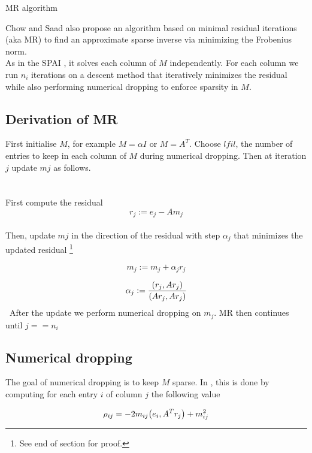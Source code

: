 \documentclass[paper=A4, fontsize=11pt]{scrartcl}
\let\originalleft\left
\let\originalright\right
\renewcommand{\left}{\mathopen{}\mathclose\bgroup\originalleft}
\renewcommand{\right}{\aftergroup\egroup\originalright}
\theoremstyle{remark}
\begin{document}
\begin{section}{MR algorithm}
	
	Chow and Saad \cite{chow} also propose an algorithm based on minimal residual iterations (aka MR) to find an approximate sparse inverse via minimizing the Frobenius norm.\\
	
	As in the SPAI \cite{grote}, it solves each column of $M$ independently. For each column we run $n_{i}$ iterations on a descent method that iteratively minimizes the residual while also performing numerical dropping to enforce sparsity in $M$.
	
	\subsection{Derivation of MR}
	
	First initialise $M$, for example $M = \alpha I$ or $M = A^{T}$. Choose $lfil$, the number of entries to keep in each column of $M$ during numerical dropping.
	Then at iteration $j$ update $m{j}$ as follows.
	\\\\\\
	First compute the residual
	\begin{equation}
	r_{j} :=e_{j}-A m_{j}
	\end{equation}
	\\
	Then, update $m{j}$ in the direction of the residual with step $\alpha_{j}$ that minimizes the updated residual \footnote{See end of section for proof.}
	
	\begin{equation}
	m_{j} :=m_{j}+\alpha_{j} r_{j}
	\end{equation}
	
	\begin{equation}
	\alpha_{j} :=\frac{\left(r_{j}, A r_{j}\right)}{\left(A r_{j}, A r_{j}\right)}
	\end{equation}
	\,
	After the update we perform numerical dropping on $m_{j}$. MR then continues until $j == n_{i}$
	
	
	\subsection{Numerical dropping}
	
	The goal of numerical dropping is to keep $M$ sparse. In \cite{chow}, this is done by computing for each entry $i$ of column $j$ the following value
	

	\begin{equation}
	\rho_{i j}=-2 m_{i j}\left(e_{i}, A^{T} r_{j}\right)+m_{i j}^{2}
	\end{equation}


\end{section}
\end{document}
